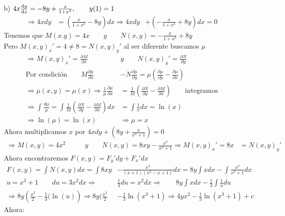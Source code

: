 \begin{itemize}
   \item[b)] $4x \dv{y}{x} = -8y + \frac{x}{1+x^{3}}, \qquad y(1)=1$
   \begin{align*}
       \Rightarrow 4xdy &= \left(\frac{x}{1+x^3}-8y\right)dx
       \Rightarrow 4xdy &+ \left(-\frac{x}{1+x^3}+8y\right)dx=0
   \end{align*}
   Tenemos que $M(x.y)=4x \qquad y \qquad N(x,y)=-\frac{x}{1+x^3}+8y$ \\
   Pero $M(x,y)_x'=4\not=8=N(x,y)_y'$ \qquad al ser diferente buscamos $\mu$\\
   \begin{align*}
       \Rightarrow M(x,y)_x'=\frac{\partial M}{\partial x} \qquad &y \qquad N(x,y)_y'=\frac{\partial N}{\partial y}\\
       \text{Por condición} \qquad M\frac{\partial \mu}{\partial x} &- N\frac{\partial \mu}{\partial y}=\mu \left(\frac{\partial \mu}{\partial y} - \frac{\partial \mu}{\partial x}\right)\\
       \Rightarrow \mu(x,y)=\mu(x) \Rightarrow \frac{1}{\mu}\frac{\partial \mu}{\partial x} &= \frac{1}{M}\left(\frac{\partial N}{\partial y} - \frac{\partial M}{\partial x}\right) \qquad \text{integramos}\\
       \Rightarrow \int \frac{d\mu}{\mu}= \int \frac{1}{M}\left(\frac{\partial N}{\partial y} - \frac{\partial M}{\partial x}\right)dx &= \int \frac{1}{x}dx=\ln(x)\\
       \Rightarrow \ln(\mu)=\ln(x) &\Rightarrow \mu=x
   \end{align*}
   Ahora multiplicamos $x$ por $4xdy+\left(8y+\frac{x}{x^3+1}\right)=0$
   \begin{align*}
       \Rightarrow M(x,y)=4x^2 \qquad &y \qquad N(x,y)=8xy-\frac{x^2}{x^3+1}
       \Rightarrow M(x,y)_x'=8x &= N(x,y)_y'
   \end{align*}
   Ahora encontraremos $F(x,y)=F_y'dy+F_x'dx$
   \begin{align*}
       F(x,y)=\int N(x,y)dx = \int 8xy &- \frac{x^2}{(x+1)(x^2-x+1)}dx=8y\int xdx - \int \frac{x^2}{x^3+1}dx\\
       u=x^3+1 \qquad du=3x^2dx \Rightarrow &\frac{1}{3}du=x^2dx \Rightarrow \qquad 8y\int xdx-\frac{1}{3}\int \frac{1}{u}du\\
       \Rightarrow 8y\left(\frac{x^2}{2}-\frac{1}{3}(\ln(u)\right) \Rightarrow 8y(\frac{x^2}{2} &- \frac{1}{3}\ln(x^3+1) \Rightarrow4yx^2-\frac{1}{3}\ln(x^3+1)+c
   \end{align*}
   Ahora:
   \begin{align*}

\end{align*}
\end{itemize}
